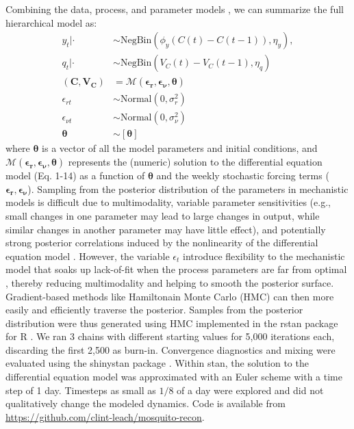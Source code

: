 \documentclass[10pt,letterpaper]{article}
\begin{document}
Combining the data, process, and parameter models \cite{Berliner1996}, we can summarize the full hierarchical model as:
\begin{align}
y_t | \cdot & \sim \text{NegBin}(\phi_y (C(t) - C(t-1)), \eta_y),
\\
q_t | \cdot &\sim \text{NegBin}(V_{C}(t) - V_{C}(t-1), \eta_q)\\
(\mathbf{C}, \mathbf{V_C}) & = \mathcal{M}(\boldsymbol{\epsilon_r}, \boldsymbol{\epsilon_{\nu}},\boldsymbol{\theta})\\
\epsilon_{rt} & \sim \text{Normal}(0, \sigma^2_r)\\
\epsilon_{\nu t} & \sim \text{Normal}(0, \sigma^2_{\nu})\\
\boldsymbol{\theta} & \sim [\boldsymbol{\theta}]
\end{align}
where $\boldsymbol{\theta}$ is a vector of all the model parameters and initial conditions, and $\mathcal{M}(\boldsymbol{\epsilon_r}, \boldsymbol{\epsilon_{\nu}},\boldsymbol{\theta})$ represents the (numeric) solution to the differential equation model (Eq. 1-14) as a function of $\boldsymbol{\theta}$ and the weekly stochastic forcing terms ($\boldsymbol{\epsilon_{r}}, \boldsymbol{\epsilon_{\nu}}$).
Sampling from the posterior distribution of the parameters in mechanistic models is difficult due to multimodality, variable parameter sensitivities (e.g., small changes in one parameter may lead to large changes in output, while similar changes in another parameter may have little effect), and potentially strong posterior correlations induced by the nonlinearity of the differential equation model \cite{Reilly2005, Girolami2008, Calderhead2011}.
However, the variable $\epsilon_t$ introduce flexibility to the mechanistic model that 
soaks up lack-of-fit when the process parameters are far from optimal \cite{Leander2014}, thereby reducing multimodality and helping to smooth the posterior surface.
Gradient-based methods like Hamiltonain Monte Carlo (HMC) can then more easily and efficiently traverse the posterior.
Samples from the posterior distribution were thus generated using HMC implemented in the rstan package \cite{Carpenter2016, Rstan2017} for R \cite{R2016}. 
We ran 3 chains with different starting values for 5,000 iterations each, discarding the first 2,500 as burn-in.
Convergence diagnostics and mixing were evaluated using the shinystan package \cite{shinystan}.
Within stan, the solution to the differential equation model was approximated with an Euler scheme with a time step of 1 day.  
Timesteps as small as $1/8$ of a day were explored and did not qualitatively change the modeled dynamics.
Code is available from \href{https://github.com/clint-leach/mosquito-recon}{https://github.com/clint-leach/mosquito-recon}.
\end{document}
